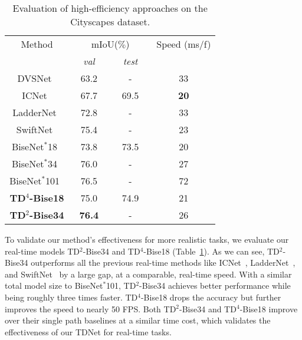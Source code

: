 \documentclass[10pt,twocolumn,letterpaper]{article}
\begin{document}
\begin{table}
\centering
\begin{tabular}{ |c|cc|c|} 
\hline
{Method}       &\multicolumn{2}{c|}{{mIoU($\%$)}}     &{Speed (ms/f)}  \\
                     &{~~\textit{val}~~} &{~~\textit{test}~~}     &{}     \\
 \hline 
 \hline 
 \small{DVSNet~\cite{xu2018dynamic} }                       &63.2 &-    &33 \\ 
 \small{ICNet~\cite{zhao2018icnet} }                       &67.7 &69.5    &\textbf{20} \\ 
 \small{LadderNet~\cite{kreso2017ladder} }                 &72.8 &-       &33 \\ 
 \small{SwiftNet~\cite{orsic2019defense} }                 &75.4 &-    &23 \\ 
 \hline  
 \small{BiseNet$^*$18~\cite{yu2018bisenet}}          &73.8 &73.5  &20\\  
 \small{BiseNet$^*$34~\cite{yu2018bisenet}}          &76.0 &-  &27\\ 
 \small{BiseNet$^*$101~\cite{yu2018bisenet}}          &76.5 &-  &72\\ 
 \hline 
 \small{\textbf{TD$^4$-Bise18}}                   &75.0 &74.9  &21\\ 
 \small{\textbf{TD$^2$-Bise34}}                   &\textbf{76.4} &-       & 26 \\ 
 \hline
\end{tabular}
\vspace{0.1cm}
\caption{\small{Evaluation of high-efficiency approaches on the Cityscapes dataset.}}
\label{tab2}
\vspace{-0.5cm}
\end{table}


To validate our method's effectiveness for more realistic tasks, we evaluate our real-time models TD$^2$-Bise34 and TD$^4$-Bise18 (Table~\ref{tab2}).
As we can see, TD$^2$-Bise34 outperforms all the previous real-time methods like ICNet~\cite{zhao2018icnet}, LadderNet~\cite{kreso2017ladder}, and SwiftNet~\cite{orsic2019defense} by a large gap, at a comparable, real-time speed.
With a similar total model size to BiseNet$^*$101, TD$^2$-Bise34 achieves better performance while being roughly three times faster.
TD$^4$-Bise18 drops the accuracy but further improves the speed to nearly 50 FPS. 
Both TD$^2$-Bise34 and TD$^4$-Bise18 improve over their single path baselines at a similar time cost, which validates the effectiveness of our TDNet for real-time tasks.
\end{document}
